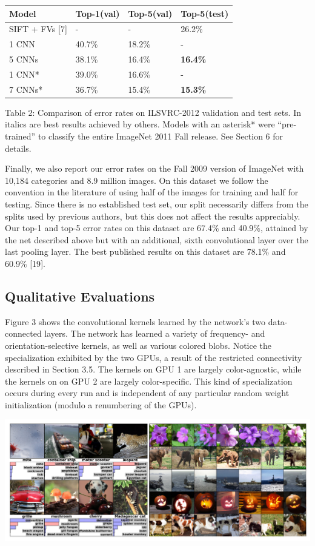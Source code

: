 \documentclass[12pt,a4paper,UTF8,twoside]{book}
\begin{document}
\begin{longtable}[]{@{}llll@{}}
\toprule
\textbf{Model} & \textbf{Top-1(val)} & \textbf{Top-5(val)} & \textbf{Top-5(test)}\tabularnewline
\midrule
\endhead
SIFT + FVs {[}7{]} & - & - & 26.2\%\tabularnewline
1 CNN & 40.7\% & 18.2\% & -\tabularnewline
5 CNNs & 38.1\% & 16.4\% & \textbf{16.4\%}\tabularnewline
1 CNN* & 39.0\% & 16.6\% & -\tabularnewline
7 CNNs* & 36.7\% & 15.4\% & \textbf{15.3\%}\tabularnewline
\bottomrule
\end{longtable}

Table 2: Comparison of error rates on ILSVRC-2012 validation and test sets. In italics are best results achieved by others. Models with an asterisk* were ``pre-trained'' to classify the entire ImageNet 2011 Fall release. See Section 6 for details.

Finally, we also report our error rates on the Fall 2009 version of ImageNet with 10,184 categories and 8.9 million images. On this dataset we follow the convention in the literature of using half of the images for training and half for testing. Since there is no established test set, our split necessarily differs from the splits used by previous authors, but this does not affect the results appreciably. Our top-1 and top-5 error rates on this dataset are 67.4\% and 40.9\%, attained by the net described above but with an additional, sixth convolutional layer over the last pooling layer. The best published results on this dataset are 78.1\% and 60.9\% {[}19{]}.

\hypertarget{qualitative-evaluations}{%
\subsection{Qualitative Evaluations}\label{qualitative-evaluations}}

Figure 3 shows the convolutional kernels learned by the network's two data-connected layers. The network has learned a variety of frequency- and orientation-selective kernels, as well as various colored blobs. Notice the specialization exhibited by the two GPUs, a result of the restricted connectivity described in Section 3.5. The kernels on GPU 1 are largely color-agnostic, while the kernels on on GPU 2 are largely color-specific. This kind of specialization occurs during every run and is independent of any particular random weight initialization (modulo a renumbering of the GPUs).

\begin{center}\includegraphics[width=0.7\linewidth]{img/01-04} \end{center}
\end{document}
